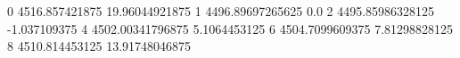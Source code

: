 0 4516.857421875 19.96044921875
1 4496.89697265625 0.0
2 4495.85986328125 -1.037109375
4 4502.00341796875 5.1064453125
6 4504.7099609375 7.81298828125
8 4510.814453125 13.91748046875
